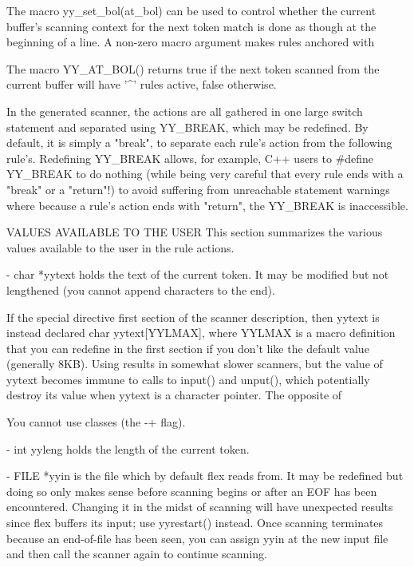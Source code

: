 \documentclass[12pt,spanish,twocolumn,lettersize]{article}
\begin{document}
{       The  macro  yy_set_bol(at_bol)  can  be	used  to  control
       whether the current buffer's scanning context for the next
       token  match is done as though at the beginning of a line.
       A non-zero macro argument makes rules anchored with

       The macro YY_AT_BOL()  returns  true  if	 the  next  token
       scanned	from  the  current  buffer  will  have	'^' rules
       active, false otherwise.

       In the generated scanner, the actions are all gathered  in
       one  large  switch statement and separated using YY_BREAK,
       which may be  redefined.	  By  default,	it  is	simply	a
       "break", to separate each rule's action from the following
       rule's.	Redefining  YY_BREAK  allows,  for  example,  C++
       users  to #define YY_BREAK to do nothing (while being very
       careful	that  every  rule  ends	 with  a  "break"  or	a
       "return"!)  to  avoid suffering from unreachable statement
       warnings where because a rule's action ends with "return",
       the YY_BREAK is inaccessible.

VALUES AVAILABLE TO THE USER
       This  section  summarizes  the various values available to
       the user in the rule actions.

       -      char *yytext holds the text of the  current  token.
	      It  may  be modified but not lengthened (you cannot
	      append characters to the end).

	      If the special  directive	 %
	      first  section  of  the  scanner	description, then
	      yytext is	 instead  declared  char  yytext[YYLMAX],
	      where  YYLMAX  is	 a  macro definition that you can
	      redefine in the first section if you don't like the
	      default	value	(generally  8KB).   Using  %
	      results in somewhat slower scanners, but the  value
	      of  yytext  becomes  immune to calls to input() and
	      unput(), which potentially destroy its  value  when
	      yytext  is  a  character	pointer.  The opposite of

	      You cannot use %
	      classes (the -+ flag).

       -      int yyleng holds the length of the current token.

       -      FILE  *yyin is the file which by default flex reads
	      from.  It may be redefined but doing so only  makes
	      sense  before  scanning  begins or after an EOF has
	      been encountered.	 Changing  it  in  the	midst  of
	      scanning	will  have  unexpected results since flex
	      buffers its input; use yyrestart()  instead.   Once
	      scanning terminates because an end-of-file has been
	      seen, you can assign yyin at the new input file and
	      then call the scanner again to continue scanning.

}
\end{document}
